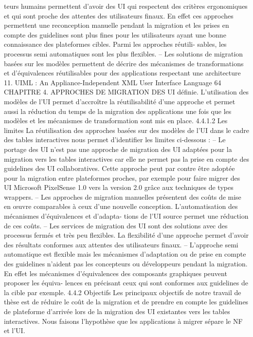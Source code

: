 \documentclass{article}
\begin{document}
teurs humains permettent d’avoir des UI qui respectent des critères ergonomiques et qui sont
proche des attentes des utilisateurs ﬁnaux. En effet ces approches permettent une reconception
manuelle pendant la migration et les prises en compte des guidelines sont plus ﬁnes pour les
utilisateurs ayant une bonne connaissance des plateformes cibles. Parmi les approches réutili-
sables, les processus semi automatiques sont les plus ﬂexibles.
– Les solutions de migration basées sur les modèles permettent de décrire des mécanismes de
transformations et d’équivalences réutilisables pour des applications respectant une architecture
11. UIML : An Appliance-Independent XML User Interface Language
64
CHAPITRE 4. APPROCHES DE MIGRATION DES UI
déﬁnie. L’utilisation des modèles de l’UI permet d’accroître la réutilisabilité d’une approche et
permet aussi la réduction du temps de la migration des applications une fois que les modèles et
les mécanismes de transformation sont mis en place.
4.4.1.2
Les limites
La réutilisation des approches basées sur des modèles de l’UI dans le cadre des tables interactives
nous permet d’identiﬁer les limites ci-dessous :
– Le portage des UI n’est pas une approche de migration des UI adaptées pour la migration
vers les tables interactives car elle ne permet pas la prise en compte des guidelines des UI
collaboratives. Cette approche peut par contre être adoptée pour la migration entre plateformes
proches, par exemple pour faire migrer des UI Microsoft PixelSense 1.0 vers la version 2.0
grâce aux techniques de types wrappers.
– Les approches de migration manuelles présentent des coûts de mise en œuvre comparables à
ceux d’une nouvelle conception. L’automatisation des mécanismes d’équivalences et d’adapta-
tions de l’UI source permet une réduction de ces coûts.
– Les services de migration des UI sont des solutions avec des processus fermés et très peu
ﬂexibles. La ﬂexibilité d’une approche permet d’avoir des résultats conformes aux attentes des
utilisateurs ﬁnaux.
– L’approche semi automatique est ﬂexible mais les mécanismes d’adaptation ou de prise en
compte des guidelines n’aident pas les concepteurs ou développeurs pendant la migration. En
effet les mécanismes d’équivalences des composants graphiques peuvent proposer les équiva-
lences en précisant ceux qui sont conformes aux guidelines de la cible par exemple.
4.4.2
Objectifs
Les principaux objectifs de notre travail de thèse est de réduire le coût de la migration et de
prendre en compte les guidelines de plateforme d’arrivée lors de la migration des UI existantes vers
les tables interactives. Nous faisons l’hypothèse que les applications à migrer sépare le NF et l’UI.
\end{document}

